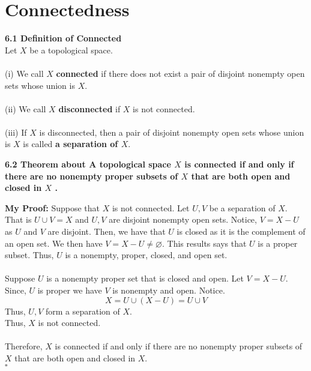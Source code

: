\documentclass[12pt]{article}
\newenvironment{proofed}[1][]{\par \medskip \noindent \textbf{#1 Proof: }}{\hfill$\square$}
\newenvironment{defn}[2][]{\par \medskip \noindent \textbf{#1 Definition of \large#2 \medskip \\}}{\rmfamily \medskip}
\newenvironment{thm}[2][]{\par \medskip \noindent \textbf{#1 Theorem about \large#2 \medskip \\}}{\rmfamily \medskip}
\begin{document}
	\section{Connectedness}
	\begin{defn}[6.1]{Connected}
		Let $ X $ be a topological space.\\
		\\
		(i) We call $X$ \textbf{connected} if there does not exist a pair of disjoint
		nonempty open sets whose union is $X .$\\
		\\
		(ii) We call $X$ \textbf{disconnected} if $X$ is not connected.\\
		\\
		(iii) If $X$ is disconnected, then a pair of disjoint nonempty open sets
		whose union is $X$ is called \textbf{a separation of $X .$}
	\end{defn}
	\begin{thm}[6.2]{A topological space $X$ is connected if and only if there are
			no nonempty proper subsets of $X$ that are both open and closed in $X$ .}
		\begin{proofed}[My]
			Suppose that $ X $ is not connected. Let $ U,V $ be a separation of $ X $. That is $ U\cup V = X$ and $ U,V $ are disjoint nonempty open sets. Notice, $ V=X-U  $ as $ U $ and $ V $ are disjoint. Then, we have that $ U $ is closed as it is the complement of an open set. We then have $ V=X-U\not= \varnothing $. This results says that $ U $ is a proper subset. Thus, $ U $ is a nonempty, proper, closed, and open set.\\
			\\
			Suppose $ U$ is a nonempty proper set that is closed and open. Let $ V=X-U $. Since, $ U $ is proper we have $ V $ is nonempty and open. Notice.
			\[X=U\cup(X-U)=U\cup V\]
			Thus, $ U,V $ form a separation of $ X $.\\
			Thus, $ X $ is not connected.\\
			\\
			Therefore, $X$ is connected if and only if there are no nonempty proper subsets of $X$ that are both open and closed in $X .$\\
		\end{proofed}
	\end{thm}
\end{document}
